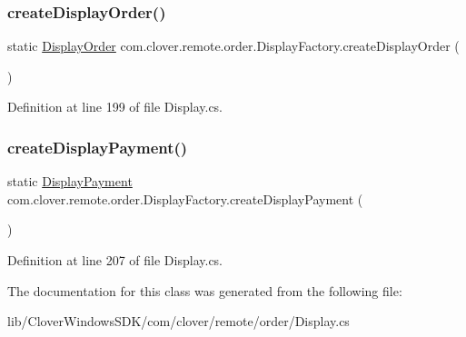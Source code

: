 \subsubsection{\texorpdfstring{create\+Display\+Order()}{createDisplayOrder()}}
{\footnotesize\ttfamily static \hyperlink{classcom_1_1clover_1_1remote_1_1order_1_1_display_order}{Display\+Order} com.\+clover.\+remote.\+order.\+Display\+Factory.\+create\+Display\+Order (\begin{DoxyParamCaption}{ }\end{DoxyParamCaption})\hspace{0.3cm}{\ttfamily [static]}}



Definition at line 199 of file Display.\+cs.

\mbox{\label{classcom_1_1clover_1_1remote_1_1order_1_1_display_factory_aaadbdd4904ce0d467b0f72f09c8cca0b}} 
\subsubsection{\texorpdfstring{create\+Display\+Payment()}{createDisplayPayment()}}
{\footnotesize\ttfamily static \hyperlink{classcom_1_1clover_1_1remote_1_1order_1_1_display_payment}{Display\+Payment} com.\+clover.\+remote.\+order.\+Display\+Factory.\+create\+Display\+Payment (\begin{DoxyParamCaption}{ }\end{DoxyParamCaption})\hspace{0.3cm}{\ttfamily [static]}}



Definition at line 207 of file Display.\+cs.



The documentation for this class was generated from the following file\+:\begin{DoxyCompactItemize}
\item 
lib/\+Clover\+Windows\+S\+D\+K/com/clover/remote/order/Display.\+cs\end{DoxyCompactItemize}
